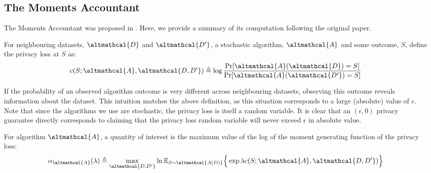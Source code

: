 \subsection{The Moments Accountant}
The Moments Accountant was proposed in \citep{moments_account}. Here, we provide a summary of its computation following the original paper. 

\begin{definition} For neighbouring datasets, $\altmathcal{D}$ and $\altmathcal{D'}$, a stochastic algorithm, $\altmathcal{A}$ and some outcome, $S$, define the privacy loss at $S$ as:
	\begin{equation}
	c(S; \altmathcal{A}, \altmathcal{D, D'}) \triangleq \log \frac{\Pr[ \altmathcal{A}( \altmathcal{D})=S]}{\Pr[ \altmathcal{A}(\altmathcal{D'}) = S]}
	\end{equation}
\end{definition}
If the probability of an observed algorithm outcome is very different across neighbouring datasets, observing this outcome reveals information about the dataset. This intuition matches the above definition, as this situation corresponds to a large (absolute) value of $c$. Note that since the algorithms we use are stochastic, the privacy loss is itself a random variable. It is clear that an $(\epsilon, 0)$ privacy guarantee directly corresponds to claiming that the privacy loss random variable will never exceed $\epsilon$ in absolute value.

\begin{definition}
	For algorithm $\altmathcal{A}$, a quantity of interest is the maximum value of the log of the moment generating function of the privacy loss:
	\begin{align}
	\alpha_\altmathcal{A}(\lambda) \triangleq \max_{\altmathcal{D, D'}} \ln \mathbb{E}_{S \sim \altmathcal{A(D)}} \Big \lbrace \exp \lambda c(S; \altmathcal{A}, \altmathcal{D, D'}) \Big \rbrace
	\end{align}
\end{definition}

